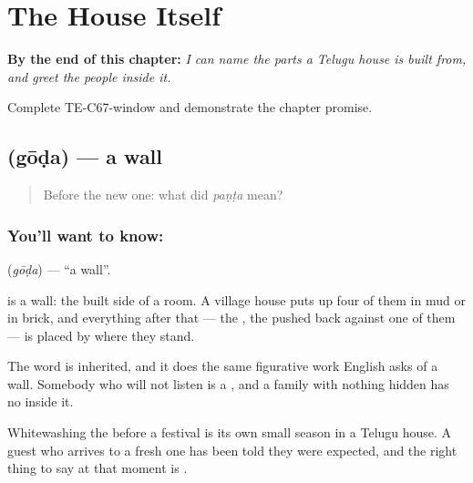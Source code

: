 
\chapter{The House Itself}
\label{ch:te-the-house-itself}

\begin{chapteropening}
\textbf{By the end of this chapter:} \emph{I can name the parts a Telugu house is built from, and greet the people inside it.}

Complete TE-C67-window and demonstrate the chapter promise.
\end{chapteropening}

\section[\texorpdfstring{\te{గోడ} (gōḍa)}{గోడ (gōḍa)}]{ (gōḍa) — a wall}

\label{lesson:TE-C67-wall}



\begin{quote}
Before the new one: what did \emph{paṇṭa} mean?
\end{quote}

\subsection*{You'll want to know: }
\textbf{} (\emph{gōḍa}) — \textquotedblleft{}a wall\textquotedblright{}.

 is a wall: the built side of a room. A village house puts up four of them in mud or in brick, and everything after that — the , the  pushed back against one of them — is placed by where they stand.

The word is inherited, and it does the same figurative work English asks of a wall. Somebody who will not listen is a , and a family with nothing hidden has no  inside it.

Whitewashing the  before a festival is its own small season in a Telugu house. A guest who arrives to a fresh one has been told they were expected, and the right thing to say at that moment is .

